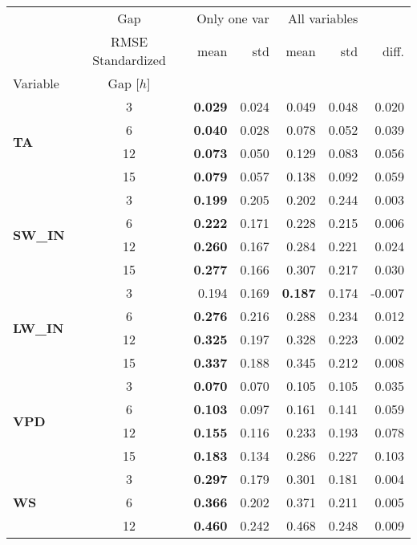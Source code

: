 \begin{table}
\centering
\caption{\CapSingleVar}
\label{single_var}
\begin{tabular}{p{2.1cm}c|rr|rr|r}
\toprule
 & Gap & \multicolumn{2}{r}{Only one var} & \multicolumn{2}{r}{All variables} &  \\
 & RMSE Standardized & mean & std & mean & std & diff. \\
Variable & Gap [$h$] &  &  &  &  &  \\
\midrule
\multirow[c]{4}{*}{\parbox{2.1cm}{\textbf{TA}}} & 3 & \bfseries 0.029 & 0.024 & 0.049 & 0.048 & 0.020 \\
 & 6 & \bfseries 0.040 & 0.028 & 0.078 & 0.052 & 0.039 \\
 & 12 & \bfseries 0.073 & 0.050 & 0.129 & 0.083 & 0.056 \\
 & 15 & \bfseries 0.079 & 0.057 & 0.138 & 0.092 & 0.059 \\
\cline{1-7}
\multirow[c]{4}{*}{\parbox{2.1cm}{\textbf{SW\_IN}}} & 3 & \bfseries 0.199 & 0.205 & 0.202 & 0.244 & 0.003 \\
 & 6 & \bfseries 0.222 & 0.171 & 0.228 & 0.215 & 0.006 \\
 & 12 & \bfseries 0.260 & 0.167 & 0.284 & 0.221 & 0.024 \\
 & 15 & \bfseries 0.277 & 0.166 & 0.307 & 0.217 & 0.030 \\
\cline{1-7}
\multirow[c]{4}{*}{\parbox{2.1cm}{\textbf{LW\_IN}}} & 3 & 0.194 & 0.169 & \bfseries 0.187 & 0.174 & -0.007 \\
 & 6 & \bfseries 0.276 & 0.216 & 0.288 & 0.234 & 0.012 \\
 & 12 & \bfseries 0.325 & 0.197 & 0.328 & 0.223 & 0.002 \\
 & 15 & \bfseries 0.337 & 0.188 & 0.345 & 0.212 & 0.008 \\
\cline{1-7}
\multirow[c]{4}{*}{\parbox{2.1cm}{\textbf{VPD}}} & 3 & \bfseries 0.070 & 0.070 & 0.105 & 0.105 & 0.035 \\
 & 6 & \bfseries 0.103 & 0.097 & 0.161 & 0.141 & 0.059 \\
 & 12 & \bfseries 0.155 & 0.116 & 0.233 & 0.193 & 0.078 \\
 & 15 & \bfseries 0.183 & 0.134 & 0.286 & 0.227 & 0.103 \\
\cline{1-7}
\multirow[c]{4}{*}{\parbox{2.1cm}{\textbf{WS}}} & 3 & \bfseries 0.297 & 0.179 & 0.301 & 0.181 & 0.004 \\
 & 6 & \bfseries 0.366 & 0.202 & 0.371 & 0.211 & 0.005 \\
 & 12 & \bfseries 0.460 & 0.242 & 0.468 & 0.248 & 0.009 \\

\end{tabular}
\end{table}
